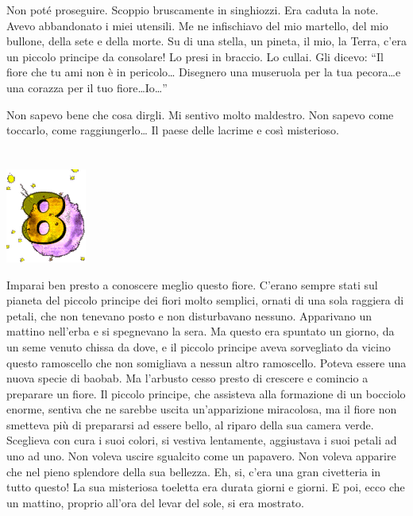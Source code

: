 \documentclass[11pt]{scrbook}
\begin{document}
Non poté proseguire. Scoppio bruscamente in singhiozzi. Era caduta la
note. Avevo abbandonato i miei utensili. Me ne infischiavo del mio
martello, del mio bullone, della sete e della morte. Su di una stella,
un pineta, il mio, la Terra, c'era un piccolo principe da consolare! Lo
presi in braccio. Lo cullai. Gli dicevo: ``Il fiore che tu ami non è in
pericolo\ldots{} Disegnero una museruola per la tua pecora\ldots{}e una
corazza per il tuo fiore\ldots{}Io\ldots{}''

Non sapevo bene che cosa dirgli. Mi sentivo molto maldestro. Non sapevo
come toccarlo, come raggiungerlo\ldots{} Il paese delle lacrime e così
misterioso.

\chapter{}
\begin{center}
\includegraphics{img/chapter8}
\end{center}

Imparai ben presto a conoscere meglio questo fiore. C'erano sempre stati
sul pianeta del piccolo principe dei fiori molto semplici, ornati di una
sola raggiera di petali, che non tenevano posto e non disturbavano
nessuno. Apparivano un mattino nell'erba e si spegnevano la sera. Ma
questo era spuntato un giorno, da un seme venuto chissa da dove, e il
piccolo principe aveva sorvegliato da vicino questo ramoscello che non
somigliava a nessun altro ramoscello. Poteva essere una nuova specie di
baobab. Ma l'arbusto cesso presto di crescere e comincio a preparare un
fiore. Il piccolo principe, che assisteva alla formazione di un bocciolo
enorme, sentiva che ne sarebbe uscita un'apparizione miracolosa, ma il
fiore non smetteva più di prepararsi ad essere bello, al riparo della
sua camera verde. Sceglieva con cura i suoi colori, si vestiva
lentamente, aggiustava i suoi petali ad uno ad uno. Non voleva uscire
sgualcito come un papavero. Non voleva apparire che nel pieno splendore
della sua bellezza. Eh, si, c'era una gran civetteria in tutto questo!
La sua misteriosa toeletta era durata giorni e giorni. E poi, ecco che
un mattino, proprio all'ora del levar del sole, si era mostrato.
\end{document}
